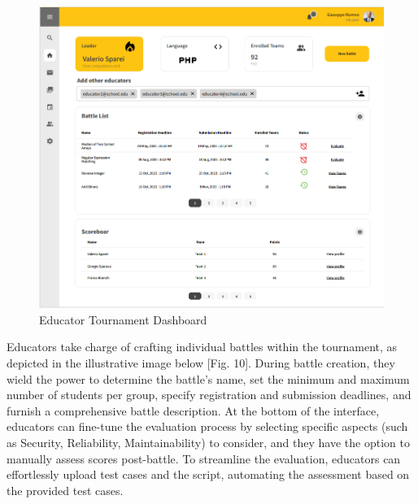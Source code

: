 \documentclass[12pt,oneside,a4paper]{article}
\begin{document}
\begin{figure}[htbp]
    \centering
    \includegraphics[width=1\linewidth]{Images/Interfaces/Educator Interfaces/EducatorTournDash.PNG}
    \caption{Educator Tournament Dashboard}
    \label{fig:enter-label}
\end{figure}

\pagebreak

\begin{flushleft}
Educators take charge of crafting individual battles within the tournament, as depicted in the illustrative image below [Fig. 10]. During battle creation, they wield the power to determine the battle's name, set the minimum and maximum number of students per group, specify registration and submission deadlines, and furnish a comprehensive battle description. At the bottom of the interface, educators can fine-tune the evaluation process by selecting specific aspects (such as Security, Reliability, Maintainability) to consider, and they have the option to manually assess scores post-battle. To streamline the evaluation, educators can effortlessly upload test cases and the script, automating the assessment based on the provided test cases.   
\end{flushleft}
\end{document}
